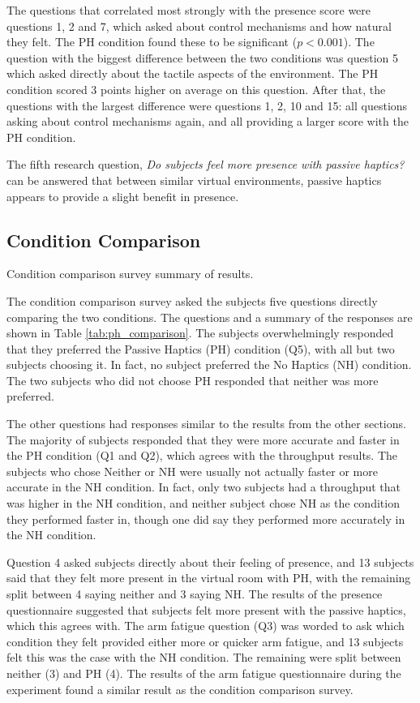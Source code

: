 The questions that correlated most strongly with the presence score were questions 1, 2 and 7, which asked about control mechanisms and how natural they felt.
The PH condition found these to be significant ($p<0.001$).
The question with the biggest difference between the two conditions was question 5 which asked directly about the tactile aspects of the environment.
The PH condition scored 3 points higher on average on this question.
After that, the questions with the largest difference were questions 1, 2, 10 and 15: all questions asking about control mechanisms again, and all providing a larger score with the PH condition.

The fifth research question, \emph{Do subjects feel more presence with passive haptics?} can be answered that between similar virtual environments, passive haptics appears to provide a slight benefit in presence.

\subsection{Condition Comparison}

\begin{table}
    \centering
    \caption{Condition comparison survey summary of results.}
    \label{tab:ph_comparison}
\end{table}

The condition comparison survey asked the subjects five questions directly comparing the two conditions.
The questions and a summary of the responses are shown in Table \ref{tab:ph_comparison}.
The subjects overwhelmingly responded that they preferred the Passive Haptics (PH) condition (Q5), with all but two subjects choosing it.
In fact, no subject preferred the No Haptics (NH) condition.
The two subjects who did not choose PH responded that neither was more preferred.

The other questions had responses similar to the results from the other sections.
The majority of subjects responded that they were more accurate and faster in the PH condition (Q1 and Q2), which agrees with the throughput results.
The subjects who chose Neither or NH were usually not actually faster or more accurate in the NH condition.
In fact, only two subjects had a throughput that was higher in the NH condition, and neither subject chose NH as the condition they performed faster in, though one did say they performed more accurately in the NH condition.

Question 4 asked subjects directly about their feeling of presence, and 13 subjects said that they felt more present in the virtual room with PH, with the remaining split between 4 saying neither and 3 saying NH.
The results of the presence questionnaire suggested that subjects felt more present with the passive haptics, which this agrees with.
The arm fatigue question (Q3) was worded to ask which condition they felt provided either more or quicker arm fatigue, and 13 subjects felt this was the case with the NH condition.
The remaining were split between neither (3) and PH (4).
The results of the arm fatigue questionnaire during the experiment found a similar result as the condition comparison survey.

